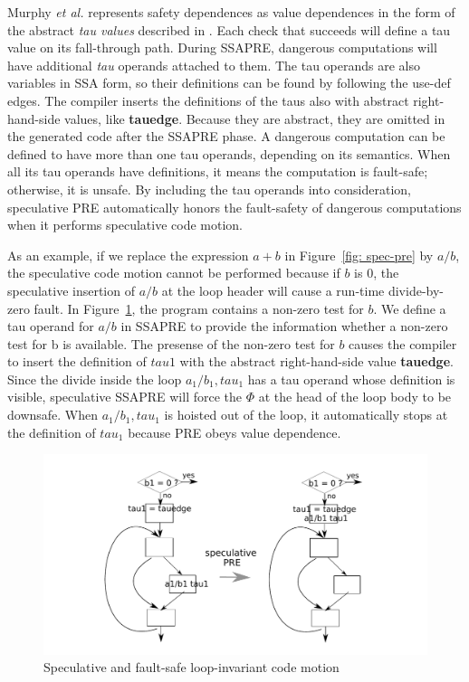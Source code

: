 Murphy {\it et al.} represents safety dependences as value dependences in the
form of the abstract \emph{tau values} described in \cite{Menon06}.  Each check
that succeeds will define a tau value on its fall-through path.  During SSAPRE,
dangerous computations will have additional \emph{tau} operands attached to 
them.  The tau
operands are also variables in SSA form, so their definitions can
be found by following the use-def edges.  The compiler inserts the definitions
of the taus also with abstract right-hand-side values, like {\bf tauedge}.
Because they are abstract, they
are omitted in the generated code after the SSAPRE phase.  A dangerous
computation can be defined to have more than one tau operands, depending on
its semantics.  When all its tau operands have definitions, 
it means the computation is fault-safe; otherwise, it is unsafe.  
By including the tau operands into consideration, speculative PRE automatically
honors the fault-safety of dangerous computations when it performs speculative
code motion.

As an example, if we replace the expression $a+b$ in Figure~\ref{fig: spec-pre}
by $a/b$, the speculative code motion cannot be performed because if $b$ is 0,
the speculative insertion of $a/b$ at the loop header will cause a run-time
divide-by-zero fault.  In Figure~\ref{fig: spec-div}, the program contains a 
non-zero test for $b$.  We define a tau operand for $a/b$ in SSAPRE to
provide the information whether a non-zero test for b is available.  The
presense of the non-zero test for $b$ causes the compiler to insert the
definition of $tau1$ with the abstract right-hand-side value {\bf tauedge}.
Since the divide inside the loop $a_1/b_1,tau_1$ has a tau operand whose
definition is visible, speculative SSAPRE will force the $\Phi$ at the head
of the loop body to be downsafe.  When $a_1/b_1,tau_1$ is hoisted out of the
loop, it automatically stops at the definition of $tau_1$ because PRE obeys
value dependence.

\begin{figure}
\centering
\includegraphics[scale=0.55]{fig-spec-div.pdf}
\caption{Speculative and fault-safe loop-invariant code motion}
\label{fig: spec-div}
\end{figure}

